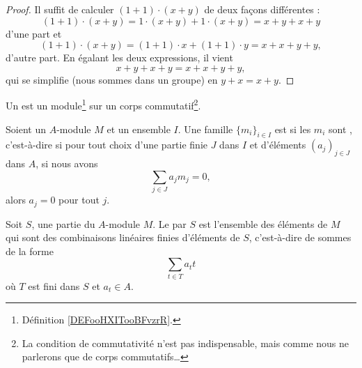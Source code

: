 \begin{proof}
    Il suffit de calculer \( (1+1)\cdot (x+y)\) de deux façons différentes :
    \begin{equation}
        (1+1)\cdot (x+y)=1\cdot (x+y)+1\cdot (x+y)=x+y+x+y
    \end{equation}
    d'une part et
    \begin{equation}
        (1+1)\cdot (x+y)=(1+1)\cdot x+(1+1)\cdot y=x+x+y+y,
    \end{equation}
    d'autre part. En égalant les deux expressions, il vient
    \begin{equation}
        x+y+x+y=x+x+y+y,
    \end{equation}
    qui se simplifie (nous sommes dans un groupe) en \( y+x=x+y\).
\end{proof}

\begin{definition}\label{DEFooKHWZooIfxdNc}
    Un  est un module\footnote{Définition \ref{DEFooHXITooBFvzrR}.} sur un corps commutatif\footnote{La condition de commutativité n'est pas indispensable, mais comme nous ne parlerons que de corps commutatifs\ldots}.
\end{definition}

\begin{definition}        \label{DEFooRUKVooLnXxdS}
    Soient un \( A\)-module \( M\) et un ensemble \( I\). Une famille \( \{ m_i \}_{i\in I}\) est  si les \( m_i\) sont , c'est-à-dire si pour tout choix d'une partie finie \( J\) dans \( I\) et d'éléments \( (a_j)_{j\in J}\) dans \( A\), si nous avons
    \begin{equation}
        \sum_{j\in J}a_jm_j=0,
    \end{equation}
    alors \( a_j=0\) pour tout \( j\).
\end{definition}

\begin{definition}        \label{DEFooWBOBooJNyyBF}
    Soit \( S\), une partie du \( A\)-module \( M\). Le  par \( S\) est l'ensemble des éléments de \( M\) qui sont des combinaisons linéaires finies d'éléments de \( S\), c'est-à-dire de sommes de la forme
    \begin{equation}
        \sum_{t\in T}a_tt
    \end{equation}
    où \( T\) est fini dans \( S\) et \( a_t\in A\).
\end{definition}

